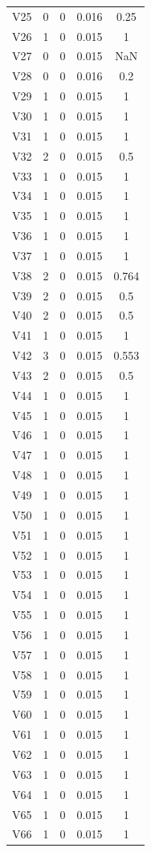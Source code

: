 \documentclass[a4paper, 12pt, openright, oneside, german, french, english, brazil]{abntex2}
\begin{document}
\begin{SingleSpace}
\begin{footnotesize}
\begin{center}
\begin{longtable}{c c c c c}
					V25 & 0 & 0 & 0.016 & 0.25 \\ 
					V26 & 1 & 0 & 0.015 & 1 \\ 
					V27 & 0 & 0 & 0.015 & NaN \\ 
					V28 & 0 & 0 & 0.016 & 0.2 \\ 
					V29 & 1 & 0 & 0.015 & 1 \\ 
					V30 & 1 & 0 & 0.015 & 1 \\ 
					V31 & 1 & 0 & 0.015 & 1 \\ 
					V32 & 2 & 0 & 0.015 & 0.5 \\ 
					V33 & 1 & 0 & 0.015 & 1 \\ 
					V34 & 1 & 0 & 0.015 & 1 \\ 
					V35 & 1 & 0 & 0.015 & 1 \\ 
					V36 & 1 & 0 & 0.015 & 1 \\ 
					V37 & 1 & 0 & 0.015 & 1 \\ 
					V38 & 2 & 0 & 0.015 & 0.764 \\ 
					V39 & 2 & 0 & 0.015 & 0.5 \\ 
					V40 & 2 & 0 & 0.015 & 0.5 \\ 
					V41 & 1 & 0 & 0.015 & 1 \\ 
					V42 & 3 & 0 & 0.015 & 0.553 \\ 
					V43 & 2 & 0 & 0.015 & 0.5 \\ 
					V44 & 1 & 0 & 0.015 & 1 \\ 
					V45 & 1 & 0 & 0.015 & 1 \\ 
					V46 & 1 & 0 & 0.015 & 1 \\ 
					V47 & 1 & 0 & 0.015 & 1 \\ 
					V48 & 1 & 0 & 0.015 & 1 \\ 
					V49 & 1 & 0 & 0.015 & 1 \\ 
					V50 & 1 & 0 & 0.015 & 1 \\ 
					V51 & 1 & 0 & 0.015 & 1 \\ 
					V52 & 1 & 0 & 0.015 & 1 \\ 
					V53 & 1 & 0 & 0.015 & 1 \\ 
					V54 & 1 & 0 & 0.015 & 1 \\ 
					V55 & 1 & 0 & 0.015 & 1 \\ 
					V56 & 1 & 0 & 0.015 & 1 \\ 
					V57 & 1 & 0 & 0.015 & 1 \\ 
					V58 & 1 & 0 & 0.015 & 1 \\ 
					V59 & 1 & 0 & 0.015 & 1 \\ 
					V60 & 1 & 0 & 0.015 & 1 \\ 
					V61 & 1 & 0 & 0.015 & 1 \\ 
					V62 & 1 & 0 & 0.015 & 1 \\ 
					V63 & 1 & 0 & 0.015 & 1 \\ 
					V64 & 1 & 0 & 0.015 & 1 \\ 
					V65 & 1 & 0 & 0.015 & 1 \\ 
					V66 & 1 & 0 & 0.015 & 1 \\ 
					

\end{longtable}
\end{center}
\end{footnotesize}
\end{SingleSpace}
\end{document}
